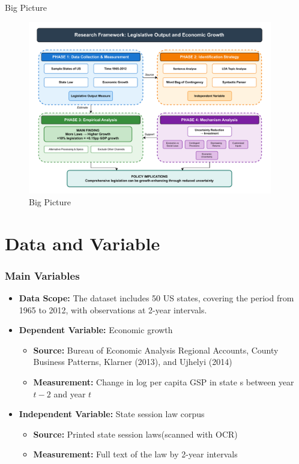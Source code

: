 \documentclass{beamer}
\begin{document}
\begin{frame}{Big Picture}
\begin{figure}[htbp]
    \centering
    \includegraphics[width=0.95\textwidth]{pic/fig3.pdf}
        \caption{Big Picture}
\end{figure}
\end{frame}

\section{Data and Variable} 
\begin{frame}
    \frametitle{Main Variables}
    {\small %
    \begin{itemize}
        \item \textbf{Data Scope:} The dataset includes 50 US states, covering the period from 1965 to 2012, with observations at 2-year intervals.
        \item \textbf{Dependent Variable:} Economic growth
        \begin{itemize}
            \item \textbf{Source:} Bureau of Economic Analysis Regional Accounts, County Business Patterns, Klarner (2013), and Ujhelyi (2014)
            \item \textbf{Measurement:} Change in log per capita GSP in state s between year $t-2$ and year $t$
        \end{itemize}
        \item \textbf{Independent Variable:} State session law corpus
        \begin{itemize}
            \item \textbf{Source:} Printed state session laws(scanned with OCR)
            \item \textbf{Measurement:} Full text of the law by 2-year intervals
        \end{itemize}
    \end{itemize}
    } %
\end{frame}
\end{document}
